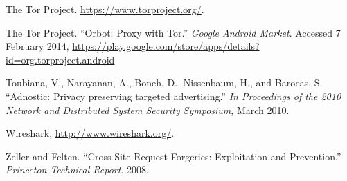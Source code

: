 \documentclass[conference]{IEEEtran}
\begin{document}
\begin{thebibliography}{1}
 The Tor Project.  \url{https://www.torproject.org/}.

 The Tor Project. ``Orbot: Proxy with Tor.'' \emph{Google Android Market}. Accessed 7 February 2014, \url{https://play.google.com/store/apps/details?id=org.torproject.android}

 Toubiana, V., Narayanan, A., Boneh, D., Nissenbaum, H., and Barocas, S. ``Adnostic: Privacy preserving targeted advertising.'' \emph{In Proceedings of the 2010 Network and Distributed System Security Symposium}, March 2010.

 Wireshark, \url{http://www.wireshark.org/}. 

 Zeller and Felten. ``Cross-Site Request Forgeries: Exploitation and Prevention.'' \emph{Princeton Technical Report}. 2008.


\end{thebibliography}




\end{document}
